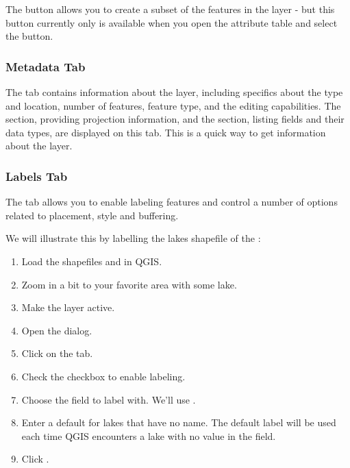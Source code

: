 The  button allows you to create a subset of the features 
in the layer - but this button currently only is available when you open the 
attribute table and select the  button.

\subsubsection{Metadata Tab}

The  tab contains information about the layer, including specifics
about the type and location, number of features, feature type, and the editing
capabilities. The  section, providing projection information, and the  section,
listing fields and their data types, are displayed 
on this tab. This is a quick way to get information about the layer.

\subsubsection{Labels Tab}

The  tab allows you to enable labeling features and control a number of
options related to placement, style and buffering.

We will illustrate this by labelling the lakes shapefile of the
:

\begin{enumerate}
\item Load the shapefiles  and  in QGIS.
\item Zoom in a bit to your favorite area with some lake.
\item Make the  layer active.
\item Open the  dialog.
\item Click on the  tab.
\item Check the  checkbox to enable labeling.
\item Choose the field to label with. 
  We'll use .
\item Enter a default for lakes that have no name. The default label will be
  used each time QGIS encounters a lake with no value in the  field.
\item Click .
\end{enumerate} 

